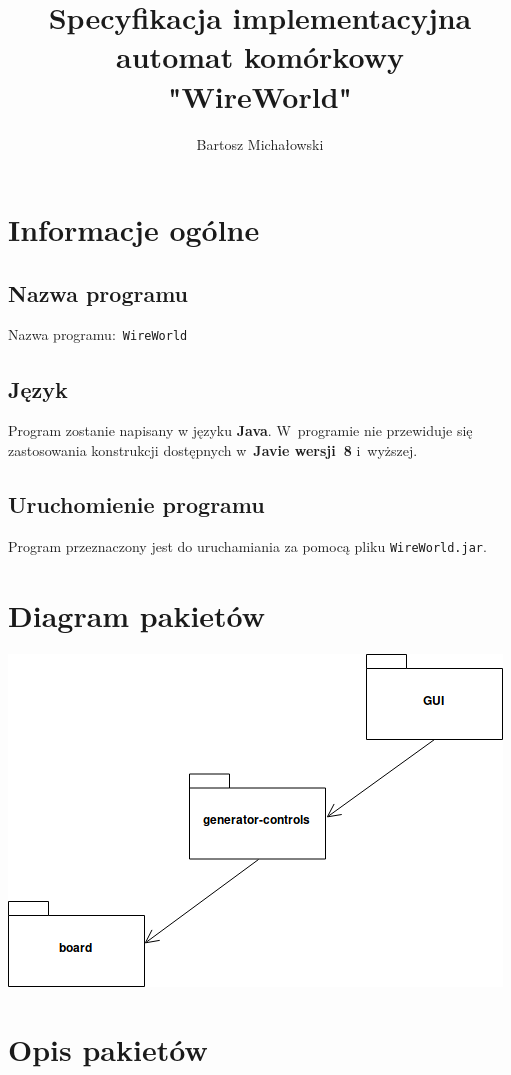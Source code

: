 \documentclass[a4paper,11pt]{article}
\author{Bartosz Michałowski}
\title{
	\Huge Specyfikacja implementacyjna \\
	automat komórkowy\\
	\textbf{"WireWorld"}
}
\begin{document}
	\maketitle 
	\newpage
	\tableofcontents 
	\newpage
	\section {Informacje ogólne}
		\subsection{Nazwa programu}
			Nazwa programu:~\texttt{WireWorld}
		\subsection{Język}
		Program zostanie napisany w języku \textbf{Java}. W~programie nie przewiduje się zastosowania konstrukcji dostępnych w~\textbf{Javie wersji~8} i~wyższej. 
		\subsection{Uruchomienie programu}
				Program przeznaczony jest do uruchamiania za pomocą pliku \texttt{WireWorld.jar}.
		\newpage
    \section{Diagram pakietów}
    \begin{center}
 \includegraphics[scale=0.6]{images/diagram_pakiety.png}
\end{center}

    \section{Opis pakietów}
\end{document}
